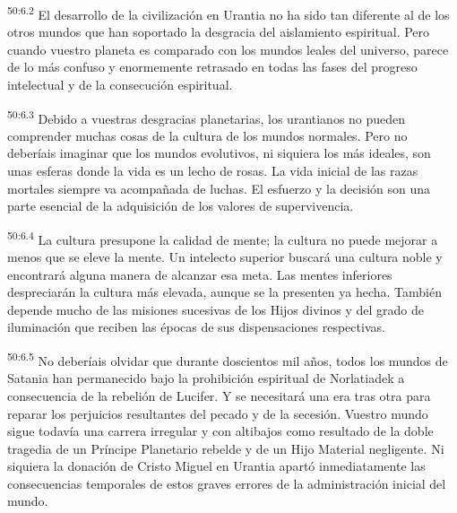 \par
\textsuperscript{50:6.2} El desarrollo de la civilización en Urantia no ha sido tan diferente al de los otros mundos que han soportado la desgracia del aislamiento espiritual. Pero cuando vuestro planeta es comparado con los mundos leales del universo, parece de lo más confuso y enormemente retrasado en todas las fases del progreso intelectual y de la consecución espiritual.

\par
\textsuperscript{50:6.3} Debido a vuestras desgracias planetarias, los urantianos no pueden comprender muchas cosas de la cultura de los mundos normales. Pero no deberíais imaginar que los mundos evolutivos, ni siquiera los más ideales, son unas esferas donde la vida es un lecho de rosas. La vida inicial de las razas mortales siempre va acompañada de luchas. El esfuerzo y la decisión son una parte esencial de la adquisición de los valores de supervivencia.

\par
\textsuperscript{50:6.4} La cultura presupone la calidad de mente; la cultura no puede mejorar a menos que se eleve la mente. Un intelecto superior buscará una cultura noble y encontrará alguna manera de alcanzar esa meta. Las mentes inferiores despreciarán la cultura más elevada, aunque se la presenten ya hecha. También depende mucho de las misiones sucesivas de los Hijos divinos y del grado de iluminación que reciben las épocas de sus dispensaciones respectivas.

\par
\textsuperscript{50:6.5} No deberíais olvidar que durante doscientos mil años, todos los mundos de Satania han permanecido bajo la prohibición espiritual de Norlatiadek a consecuencia de la rebelión de Lucifer. Y se necesitará una era tras otra para reparar los perjuicios resultantes del pecado y de la secesión. Vuestro mundo sigue todavía una carrera irregular y con altibajos como resultado de la doble tragedia de un Príncipe Planetario rebelde y de un Hijo Material negligente. Ni siquiera la donación de Cristo Miguel en Urantia apartó inmediatamente las consecuencias temporales de estos graves errores de la administración inicial del mundo.

